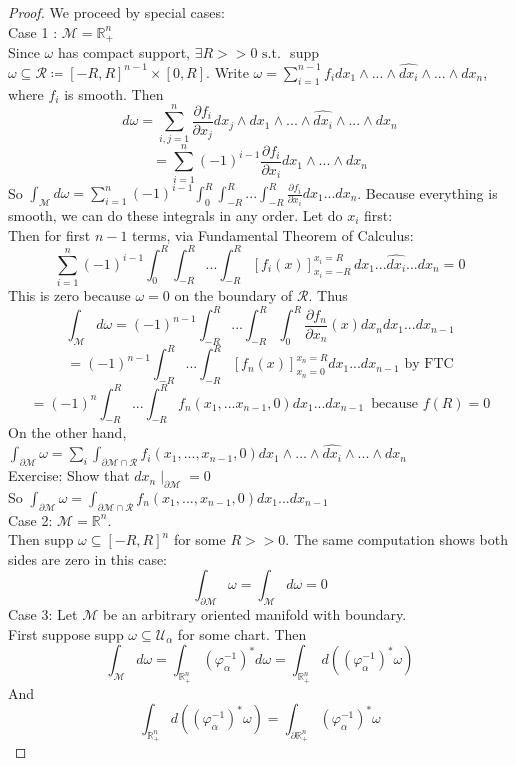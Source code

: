 \documentclass[10pt]{article}
\theoremstyle{plain}
\theoremstyle{definition}
\newcommand{\st}{\text{ s.t. }}
\newcommand{\Real}{\mathbb{R}}
\newcommand{\man}{\mathcal{M}}
\newcommand{\chartU}{\mathcal{U}}
\newcommand{\chart}{\varphi}
\newcommand{\allthewedge}[3]{{#1}_{#2}\wedge...\wedge{#1}_{#3}}
\newcommand{\iparderivof}[2]{\frac{\partial {#2}}{\partial x_{#1}}}
\newcommand{\dx}{dx}
\newcommand{\dw}{d\omega}
\newcommand{\sumfromto}[2]{\sum\limits_{#1}^{#2}}
\newcommand{\plusReal}{\Real_+ ^n}
\begin{document}
\begin{proof}
We proceed by special cases:
\\Case 1 : $\man = \plusReal$\\
Since $\omega $ has compact support, $\exists R > > 0 \st $ supp $\omega \subseteq \mathcal{R} \coloneqq [-R,R]^{n-1} \times [0,R]$. Write $\omega = \sumfromto{i=1}{n-1} f_i \dx_1 \wedge ... \wedge \hat{\dx_i} \wedge ... \wedge \dx_n$, where $f_i$ is smooth. Then $$\dw = \sumfromto{i,j = 1}{n} \iparderivof{j}{f_i}\dx_j \wedge \dx_1 \wedge ... \wedge \hat{\dx_i} \wedge ... \wedge \dx_n$$
$$ = \sumfromto{i=1}{n} (-1)^{i-1} \iparderivof{i}{f_i} \allthewedge{\dx}{1}{n}$$
So $\int_\man \dw= \sumfromto{i=1}{n} (-1)^{i-1} \int_0^R \int_{-R}^R ... \int_{-R}^R\iparderivof{i}{f_i} \dx_1 ... \dx_n$. Because everything is smooth, we can do these integrals in any order. Let do $x_i$ first:
\\Then for first $n-1$ terms, via Fundamental Theorem of Calculus:
$$\sumfromto{i=1}{n} (-1)^{i-1} \int_0^R \int_{-R}^R ... \int_{-R}^R[f_i(x)]^{x_i = R}_{x_i = -R}\, \dx_1 ... \hat{\dx_i}... \dx_n = 0$$
This is zero because $\omega = 0$ on the boundary of $\mathcal{R}$. Thus $$\int_\man \dw = (-1)^{n-1} \int_{-R}^R ... \int_{-R}^R \int_0^R \iparderivof{n}{f_n} (x) \dx_n \dx_1... \dx_{n-1} $$
$$= (-1)^{n-1}\int_{-R}^R ... \int_{-R}^R [f_n(x)] ^{x_n = R} _ {x_n=0} \dx_1...\dx_{n-1} \text{ by FTC}$$
$$= (-1)^{n}\int_{-R}^R ... \int_{-R}^R f_n(x_1,...x_{n-1}, 0) \dx_1...\dx_{n-1} \, \text{ because } f(R) = 0 $$
On the other hand, $\int_{\partial \man} \omega = \sumfromto{i}{} \int_{\partial \man \cap \mathcal{R}} f_i(x_1,...,x_{n-1},0) \dx_1 \wedge ... \wedge \hat{\dx_i}\wedge ... \wedge \dx_n$\\
Exercise: Show that $\dx_n \mid _{\partial  \man} = 0$\\
So $\int_{\partial \man} \omega = \int_{\partial \man \cap \mathcal{R}} f_n(x_1,...,x_{n-1},0) \dx_1...\dx_{n-1}$\\
Case 2: $\man = \Real ^n$.\\
Then supp $\omega \subseteq [-R,R]^n$ for some $R>>0$. The same computation shows both sides are zero in this case: 
$$\int_{\partial \man} \omega = \int_\man \dw = 0$$
Case 3: Let $\man$ be an arbitrary oriented manifold with boundary.\\
First suppose supp $\omega \subseteq \chartU _\alpha$ for some chart. Then
$$\int_\man \dw = \int_{\plusReal} (\chart_\alpha^{-1})^* \dw = \int_{\plusReal} d((\chart_{\alpha} ^{-1})^* \omega)$$
And $$ \int_{\plusReal} d ((\chart_\alpha^{-1})^* \omega ) =  \int_{\partial\plusReal} ( \chart_\alpha ^{-1} )^* \omega$$

\end{proof}
\end{document}
